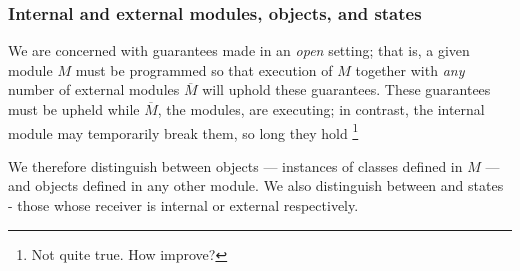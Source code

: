 \subsubsection{Internal and external modules, objects, and states}
 \label{s:concepts}

We are concerned with guarantees made in an \emph{open} setting; that is, a given module
$M$ must be programmed so that 
execution of $M$ together with \emph{any} number of external modules $\overline M$
will uphold these guarantees. %
These guarantees must be upheld while 
 $\overline M$, the  \emph{\externalM} modules, are executing; in contrast, the internal module may 
temporarily break them,
so long they %
hold \footnote{Not quite true. How improve?} 
 
    
We therefore distinguish between  \emph{\internalO}
objects --- instances of classes defined in $M$ ---
and \emph{\externalO} objects defined in any other module.
We also distinguish between
  \emph{\internalC} and   \emph{\externalC} states - those whose receiver is internal or external respectively. 
 
 
%




